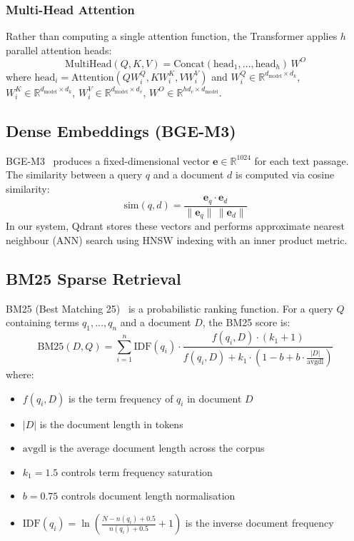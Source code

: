 \documentclass[12pt, a4paper]{article}
\begin{document}
\subsubsection{Multi-Head Attention}
Rather than computing a single attention function, the Transformer applies
$h$ parallel attention heads:
\begin{equation}
  \text{MultiHead}(Q, K, V) = \text{Concat}(\text{head}_1, \ldots, \text{head}_h)\, W^O
\end{equation}
where $\text{head}_i = \text{Attention}(Q W_i^Q, K W_i^K, V W_i^V)$ and
$W_i^Q \in \mathbb{R}^{d_{\text{model}} \times d_k}$,
$W_i^K \in \mathbb{R}^{d_{\text{model}} \times d_k}$,
$W_i^V \in \mathbb{R}^{d_{\text{model}} \times d_v}$,
$W^O \in \mathbb{R}^{h d_v \times d_{\text{model}}}$.

\subsection{Dense Embeddings (BGE-M3)}

BGE-M3~\cite{chen2024bgem3} produces a fixed-dimensional vector
$\mathbf{e} \in \mathbb{R}^{1024}$ for each text passage. The similarity
between a query $q$ and a document $d$ is computed via cosine similarity:
\begin{equation}
  \text{sim}(q, d) = \frac{\mathbf{e}_q \cdot \mathbf{e}_d}{\|\mathbf{e}_q\| \, \|\mathbf{e}_d\|}
  \label{eq:cosine}
\end{equation}
In our system, Qdrant stores these vectors and performs approximate nearest
neighbour (ANN) search using HNSW indexing with an inner product metric.

\subsection{BM25 Sparse Retrieval}

BM25 (Best Matching 25)~\cite{robertson2009bm25} is a probabilistic ranking
function. For a query $Q$ containing terms $q_1, \ldots, q_n$ and a document
$D$, the BM25 score is:
\begin{equation}
  \text{BM25}(D, Q) = \sum_{i=1}^{n} \text{IDF}(q_i) \cdot
  \frac{f(q_i, D) \cdot (k_1 + 1)}{f(q_i, D) + k_1 \cdot \left(1 - b + b \cdot \frac{|D|}{\text{avgdl}}\right)}
  \label{eq:bm25}
\end{equation}
where:
\begin{itemize}[leftmargin=2em]
  \item $f(q_i, D)$ is the term frequency of $q_i$ in document $D$
  \item $|D|$ is the document length in tokens
  \item $\text{avgdl}$ is the average document length across the corpus
  \item $k_1 = 1.5$ controls term frequency saturation
  \item $b = 0.75$ controls document length normalisation
  \item $\text{IDF}(q_i) = \ln\!\left(\frac{N - n(q_i) + 0.5}{n(q_i) + 0.5} + 1\right)$
        is the inverse document frequency
\end{itemize}
\end{document}
